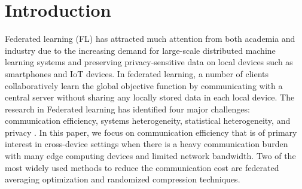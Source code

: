 \section{Introduction}

Federated learning (FL) has attracted much attention from both academia and industry due to the increasing demand for large-scale distributed machine learning systems and preserving privacy-sensitive data on local devices such as smartphones and IoT devices. In federated learning, a number of clients collaboratively learn the global objective function by communicating with a central server without sharing any locally stored data in each local device. The research in Federated learning has identified four major challenges: communication efficiency, systems heterogeneity, statistical heterogeneity, and privacy \cite{li2020federated}. In this paper, we focus on communication efficiency that is of primary interest in cross-device settings when there is a heavy communication burden with many edge computing devices and limited network bandwidth. Two of the most widely used methods to reduce the communication cost are federated averaging optimization and randomized compression techniques.

